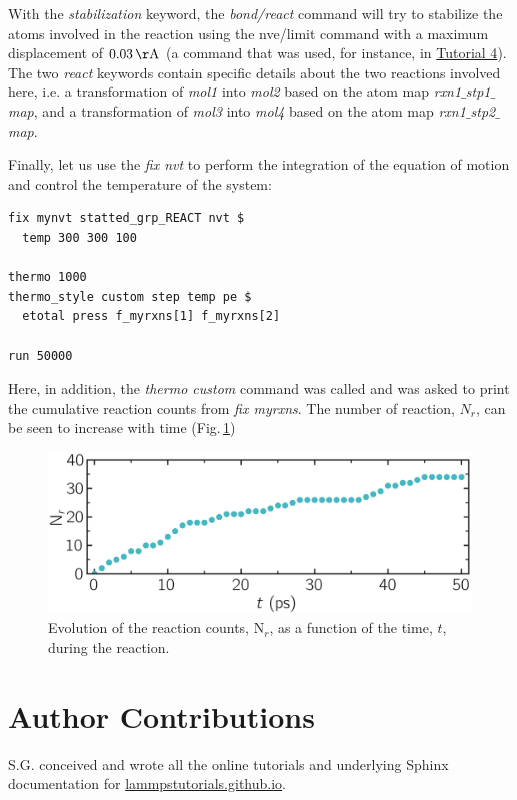 \documentclass[9pt,tutorial]{livecoms}
\begin{document}
With the \textit{stabilization} keyword, the \textit{bond/react} command will
try to stabilize the atoms involved in the reaction using the nve/limit
command with a maximum displacement of $0.03\,\mathrm{\AA{}}$ (a command that was
used, for instance, in \hyperref[sheared-confined-label]{Tutorial 4}). The two
\textit{react} keywords contain specific details about the two reactions
involved here, i.e. a transformation of \textit{mol1} into \textit{mol2} based
on the atom map \textit{rxn1$\_$stp1$\_$map}, and a transformation of 
\textit{mol3} into \textit{mol4} based on the atom map \textit{rxn1$\_$stp2$\_$map}.

Finally, let us use the \textit{fix nvt} to perform the integration of the 
equation of motion and control the temperature of the system:
{\normalsize
\begin{verbatim}
fix mynvt statted_grp_REACT nvt $
  temp 300 300 100

thermo 1000
thermo_style custom step temp pe $
  etotal press f_myrxns[1] f_myrxns[2]

run 50000
\end{verbatim}
}
Here, in addition, the \textit{thermo custom} command was called and was
asked to print the cumulative reaction counts from \textit{fix myrxns}.
The number of reaction, $N_r$, can be seen to increase with time
(Fig.\,\ref{fig:evolution-reacting})

\begin{figure}
\centering
\includegraphics[width=\linewidth]{REACT-reacting}
\caption{Evolution of the reaction counts, $\text{N}_r$,
as a function of the time, $t$, during the reaction.}
\label{fig:evolution-reacting}
\end{figure}

\section*{Author Contributions}
S.G. conceived and wrote all the online tutorials and underlying Sphinx documentation
for \href{https://lammpstutorials.github.io}{lammpstutorials.github.io}.
\end{document}
